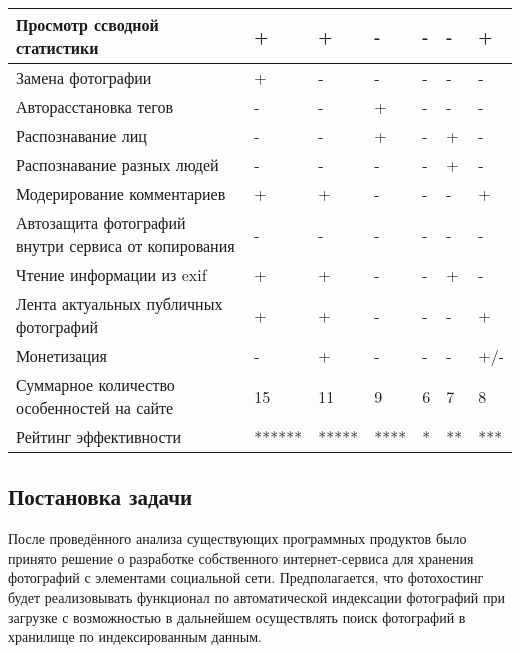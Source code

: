 \begin{landscape}
\begin{table}[H]
\begin{tabular}{|p{5.8cm}|p{2.8cm}|p{2.8cm}|p{2.8cm}|p{2.8cm}|p{2.8cm}|p{2.8cm}|}
  \hline Просмотр ссводной статистики & + & + & - & - & - & + \\ 
  \hline Замена фотографии & + & - & - & - & - & - \\ 
  \hline Авторасстановка тегов & - & - & + & - & - & - \\ 
  \hline Распознавание лиц & - & - & + & - & + & - \\ 
  \hline Распознавание разных людей & - & - & - & - & + & - \\ 
  \hline Модерирование комментариев & + & + & - & - & - & + \\ 
  \hline Автозащита фотографий внутри сервиса от копирования & - & - & - & - & - & - \\ 
  \hline Чтение информации из exif & + & + & - & - & + & - \\ 
  \hline Лента актуальных публичных фотографий & + & + & - & - & - & + \\ 
  \hline Монетизация & - & + & - & - & - & +/- \\ 
  \hline Суммарное количество особенностей на сайте & 15 & 11 & 9 & 6 & 7 & 8 \\ 
  \hline Рейтинг эффективности & ****** & ***** & **** & * & ** & *** \\
  \hline
  \end{tabular}
\end{table}
\end{landscape}

\subsection{Постановка задачи}\label{problem-formulation}
После проведённого анализа существующих программных продуктов было принято решение о разработке собственного интернет-сервиса для хранения фотографий с элементами социальной сети. 
Предполагается, что фотохостинг будет реализовывать функционал по автоматической индексации фотографий при загрузке с возможностью в дальнейшем осуществлять поиск фотографий в хранилище по индексированным данным.

